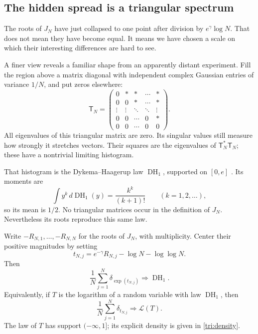 \subsection{The hidden spread is a triangular spectrum}\label{tri:section}
The roots of $J_N$ have just collapsed to one point after division by
$e^\gamma\log N$.  That does not mean they have become equal.
It means we have chosen a scale on which their interesting differences
are hard to see.

A finer view reveals a familiar shape from an apparently distant
experiment.  Fill the region above a matrix diagonal with independent
complex Gaussian entries of variance $1/N$, and put zeros elsewhere:
\[
 \mathsf T_N=
 \begin{pmatrix}
 0& *& *&\cdots& *\\
 0& 0& *&\cdots& *\\
 \vdots&\vdots&\ddots&\ddots&\vdots\\
 0&0&\cdots&0&*\\
 0&0&\cdots&0&0
 \end{pmatrix}.
\]
All eigenvalues of this triangular matrix are zero.
Its singular values still measure how strongly it stretches vectors.
Their squares are the eigenvalues of $\mathsf T_N^*\mathsf T_N$;
these have a nontrivial limiting histogram.

That histogram is the Dykema--Haagerup law
$\operatorname{DH}_1$, supported on $[0,e]$
\cite{triDykemaHaagerup,triCheliotis}.
Its moments are
\[
 \int y^k\,d\operatorname{DH}_1(y)=\frac{k^k}{(k+1)!}
 \qquad(k=1,2,\ldots),
\]
so its mean is $1/2$.
No triangular matrices occur in the definition of $J_N$.
Nevertheless its roots reproduce this same law.

\begin{theorem}\label{tri:main}
Write $-R_{N,1},\ldots,-R_{N,N}$ for the roots of $J_N$,
with multiplicity. Center their positive magnitudes by setting
\[
 t_{N,j}=e^{-\gamma}R_{N,j}-\log N-\log\log N.
\]
Then
\begin{equation}\label{tri:exp}
 \boxed{\frac1N\sum_{j=1}^N
 \delta_{\exp(t_{N,j})}
 \Longrightarrow\operatorname{DH}_1.}
\end{equation}
Equivalently, if $T$ is the logarithm of a random variable with law
$\operatorname{DH}_1$, then
\begin{equation}\label{tri:centered}
 \frac1N\sum_{j=1}^N
 \delta_{t_{N,j}}
 \Longrightarrow\mathcal L(T).
\end{equation}
The law of $T$ has support $(-\infty,1]$; its explicit density is
given in \eqref{tri:density}.
\end{theorem}

